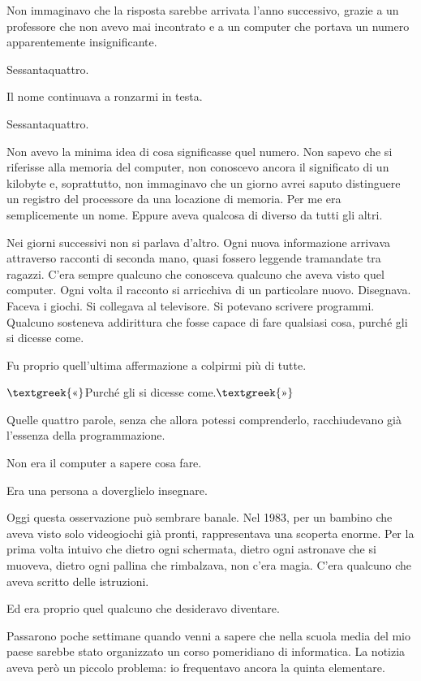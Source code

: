 \documentclass{article}
\begin{document}
Non immaginavo che la risposta sarebbe arrivata l'anno successivo, grazie a un professore che non avevo mai incontrato e
a un computer che portava un numero apparentemente insignificante.

Sessantaquattro.

Il nome continuava a ronzarmi in testa.

Sessantaquattro.

Non avevo la minima idea di cosa significasse quel numero. Non sapevo che si riferisse alla memoria del computer, non
conoscevo ancora il significato di un kilobyte e, soprattutto, non immaginavo che un giorno avrei saputo distinguere un
registro del processore da una locazione di memoria. Per me era semplicemente un nome. Eppure aveva qualcosa di diverso
da tutti gli altri.

Nei giorni successivi non si parlava d'altro. Ogni nuova informazione arrivava attraverso racconti di seconda mano,
quasi fossero leggende tramandate tra ragazzi. C'era sempre qualcuno che conosceva qualcuno che aveva visto quel
computer. Ogni volta il racconto si arricchiva di un particolare nuovo. Disegnava. Faceva i giochi. Si collegava al
televisore. Si potevano scrivere programmi. Qualcuno sosteneva addirittura che fosse capace di fare qualsiasi cosa,
purché gli si dicesse come.

Fu proprio quell'ultima affermazione a colpirmi più di tutte.

$\text{\textgreek{«}}$Purché gli si dicesse come.$\text{\textgreek{»}}$

Quelle quattro parole, senza che allora potessi comprenderlo, racchiudevano già l'essenza della programmazione.

Non era il computer a sapere cosa fare.

Era una persona a doverglielo insegnare.

Oggi questa osservazione può sembrare banale. Nel 1983, per un bambino che aveva visto solo videogiochi già pronti,
rappresentava una scoperta enorme. Per la prima volta intuivo che dietro ogni schermata, dietro ogni astronave che si
muoveva, dietro ogni pallina che rimbalzava, non c'era magia. C'era qualcuno che aveva scritto delle istruzioni.

Ed era proprio quel {\textquotedbl}qualcuno{\textquotedbl} che desideravo diventare.

Passarono poche settimane quando venni a sapere che nella scuola media del mio paese sarebbe stato organizzato un corso
pomeridiano di informatica. La notizia aveva però un piccolo problema: io frequentavo ancora la quinta elementare.
\end{document}
